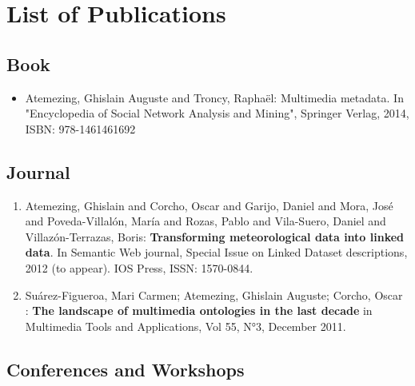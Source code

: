 

\chapter*{List of Publications}

\section*{Book}
\begin{itemize}
\item {A}temezing, {G}hislain {A}uguste and  {T}roncy, {R}apha{\"e}l: {M}ultimedia metadata. {I}n "{E}ncyclopedia of {S}ocial {N}etwork {A}nalysis and {M}ining", {S}pringer {V}erlag, 2014, {ISBN}: 978-1461461692 
\end{itemize}

\section*{Journal}
\begin{enumerate}

\item {A}temezing, {G}hislain and  {C}orcho, {O}scar and  {G}arijo, {D}aniel and  {M}ora, {J}os{\'e} and  {P}oveda-{V}illal{\'o}n, {M}ar{\'i}a and  {R}ozas, {P}ablo and  {V}ila-{S}uero, {D}aniel and  {V}illaz{\'o}n-{T}errazas, {B}oris: \textbf{{T}ransforming meteorological data into linked data}. In {S}emantic {W}eb journal, {S}pecial {I}ssue on {L}inked {D}ataset descriptions, 2012 (to appear). {IOS} {P}ress, {ISSN}: 1570-0844.

\item Su\'{a}rez-Figueroa, Mari Carmen; Atemezing, Ghislain Auguste; Corcho, Oscar : \textbf{The landscape of 
multimedia ontologies in the last decade} in  Multimedia Tools and Applications, Vol 55, N°3, December 2011.

\end{enumerate}

\section*{Conferences and Workshops}\label{conf}


